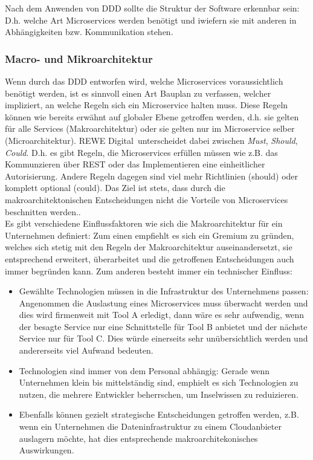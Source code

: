 Nach dem Anwenden von DDD sollte die Struktur der Software erkennbar sein: D.h. welche Art Microservices werden benötigt und iwiefern sie mit anderen in Abhängigkeiten bzw. Kommunikation stehen.   

\subsubsection{Macro- und Mikroarchitektur}

Wenn durch das DDD entworfen wird, welche Microservices voraussichtlich benötigt werden, ist es sinnvoll einen Art Bauplan zu verfassen, welcher impliziert, an welche Regeln sich ein Microservice halten muss. Diese Regeln können wie bereits erwähnt auf globaler Ebene getroffen werden, d.h. sie gelten für alle Services (Makroarchitektur) oder sie gelten nur im Microservice selber (Microarchitektur). REWE Digital unterscheidet dabei zwischen \textit{Must}, \textit{Should}, \textit{Could}. D.h. es gibt Regeln, die Microservices erfüllen müssen wie z.B. das Kommunzieren über REST oder das Implementieren eine einheitlicher Autorisierung.\cite{rewe2019mic_ppp} Andere Regeln dagegen sind viel mehr Richtlinien (should) oder komplett optional (could). Das Ziel ist stets, dass durch die makroarchitektonischen Entscheidungen nicht die Vorteile von Microservices beschnitten werden.\cite{wolff2018mic_praxis}\cite{irakli2016mic_arc}. \\

Es gibt verschiedene Einflussfaktoren wie sich die Makroarchitektur für ein Unternehmen definiert: Zum einen empfiehlt es sich ein Gremium zu gründen, welches sich stetig mit den Regeln der Makroarchitektur auseinandersetzt, sie entsprechend erweitert, überarbeitet und die getroffenen Entscheidungen auch immer begründen kann.\cite{wolff2018mic_praxis} Zum anderen besteht immer ein technischer Einfluss\cite{wolff2018mic_praxis}:
\begin{itemize}
	\item Gewählte Technologien müssen in die Infrastruktur des Unternehmens passen: Angenommen die Auslastung eines Microservices muss überwacht werden und dies wird firmenweit mit Tool A erledigt, dann wäre es sehr aufwendig, wenn der besagte Service nur eine Schnittstelle für Tool B anbietet und der nächste Service nur für Tool C. Dies würde einerseits sehr unübersichtlich werden und andererseits viel Aufwand bedeuten. 
	\item Technologien sind immer von dem Personal abhängig: Gerade wenn Unternehmen klein bis mittelständig sind, emphielt es sich Technologien zu nutzen, die mehrere Entwickler beherrschen, um Inselwissen zu reduizieren. 
	\item Ebenfalls können gezielt strategische Entscheidungen getroffen werden, z.B. wenn ein Unternehmen die Dateninfrastruktur zu einem Cloudanbieter auslagern möchte, hat dies entsprechende makroarchitekonisches Auswirkungen.
\end{itemize}

